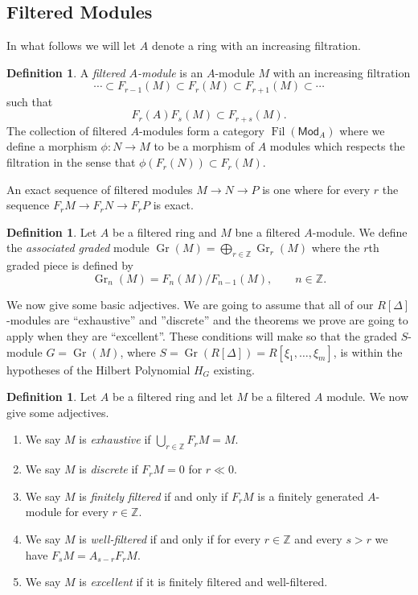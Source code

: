 \documentclass[12pt]{book}
\numberwithin{equation}{section}
\theoremstyle{definition}
\newtheorem{definition}[theorem]{Definition}
\theoremstyle{remark}
\newcommand{\ZZ}{\mathbb{Z}}
\newcommand{\Mod}{\mathsf{Mod}}
\newcommand{\Fil}{\operatorname{Fil}}
\newcommand{\Gr}{\operatorname{Gr}}
\begin{document}
\subsection{Filtered Modules}
In what follows we will let $A$ denote a ring with an increasing filtration. 
\begin{definition}
	A \emph{filtered $A$-module} is an $A$-module $M$ with an increasing filtration 
	$$\cdots \subset F_{r-1}(M) \subset F_r(M) \subset F_{r+1}(M) \subset  \cdots $$ 
	such that 
	$$F_r(A) F_s(M) \subset F_{r+s}(M).$$ 
	The collection of filtered $A$-modules form a category $\Fil(\Mod_A)$ where 
	we define a morphism $\phi:N\to M$ to be a morphism of $A$ modules which respects the filtration in the sense that $\phi(F_r(N)) \subset F_r(M)$.
	
\end{definition}
An exact sequence of filtered modules $M\to N \to P$ is one where for every $r$ the sequence $F_rM \to F_r N \to F_r P$ is exact. 

\begin{definition}
	Let $A$ be a filtered ring and $M$ bne a filtered $A$-module. 
	We define the \emph{associated graded} module $\Gr(M) = \bigoplus_{r\in \ZZ} \Gr_r(M)$ where the $r$th graded piece is defined by 
	$$\Gr_n(M) = F_n(M)/F_{n-1}(M), \qquad n \in \ZZ.$$
\end{definition}

We now give some basic adjectives. 
We are going to assume that all of our $R[\Delta]$-modules are ``exhaustive'' and ''discrete'' and the theorems we prove are going to apply when they are ``excellent''. 
These conditions will make so that the graded $S$-module $G = \Gr(M)$, where $S = \Gr(R[\Delta]) = R[\xi_1,\ldots,\xi_m]$, is within the hypotheses of the Hilbert Polynomial $H_G$ existing.
\begin{definition}
	Let $A$ be a filtered ring and let $M$ be a filtered $A$ module. 
	We now give some adjectives. 
	\begin{enumerate}
		\item We say $M$ is \emph{exhaustive} if $\bigcup_{r\in \ZZ} F_rM = M$.
		\item We say $M$ is \emph{discrete} if $F_rM=0$ for $r\ll 0$.
		\item We say $M$ is \emph{finitely filtered} if and only if $F_rM$ is a finitely generated $A$-module for every $r\in \ZZ$.
		\item We say $M$ is \emph{well-filtered} if and only if for every $r\in \ZZ$ and every $s>r$ we have $F_sM = A_{s-r} F_rM$. 
		\item We say $M$ is \emph{excellent} if it is finitely filtered and well-filtered. 
	\end{enumerate}	
\end{definition}
\end{document}
